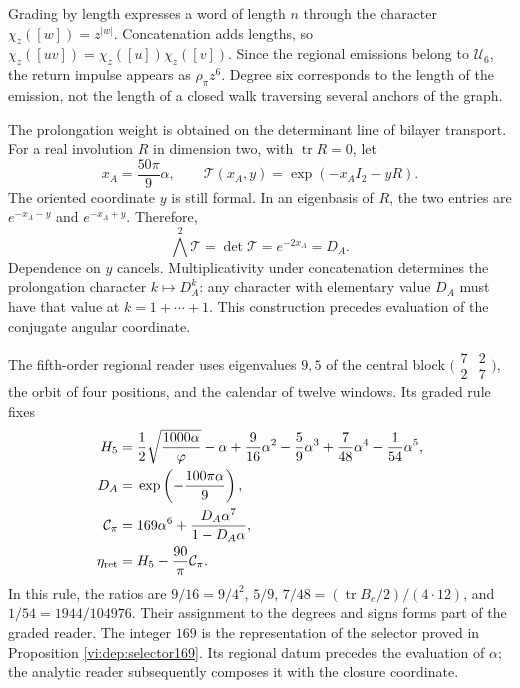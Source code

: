 Grading by length expresses a word of length \(n\)
through the character \(\chi_z([w])=z^{|w|}\). Concatenation
adds lengths, so
\(\chi_z([uv])=\chi_z([u])\chi_z([v])\). Since the regional
emissions belong to \(\mathcal U_6\), the return impulse
appears as \(\rho_\pi z^6\). Degree six corresponds to the
length of the emission, not the length of a closed walk
traversing several anchors of the graph.

The prolongation weight is obtained on the determinant line of
bilayer transport. For a real involution \(R\) in dimension two,
with \(\operatorname{tr}R=0\), let
\[
 x_A=\frac{50\pi}{9}\alpha,\qquad
 \mathcal T(x_A,y)=\exp(-x_AI_2-yR).
\]
The oriented coordinate \(y\) is still formal. In an eigenbasis
of \(R\), the two entries are \(e^{-x_A-y}\) and
\(e^{-x_A+y}\). Therefore,
\[
 \bigwedge^2\mathcal T=\det\mathcal T
 =e^{-2x_A}=D_A.
\]
Dependence on \(y\) cancels. Multiplicativity under
concatenation determines the prolongation character \(k\mapsto D_A^k\):
any character with elementary value \(D_A\) must have that value
at \(k=1+\cdots+1\). This construction precedes evaluation
of the conjugate angular coordinate.

The fifth-order regional reader uses eigenvalues \(9,5\)
of the central block \(\bigl(\begin{smallmatrix}7&2\\2&7\end{smallmatrix}\bigr)\),
the orbit of four positions, and the calendar of twelve windows.
Its graded rule fixes
\begin{align}
 H_5={}&\frac12\sqrt{\frac{1000\alpha}{\varphi}}-\alpha
       +\frac9{16}\alpha^2-\frac59\alpha^3
       +\frac7{48}\alpha^4-\frac1{54}\alpha^5,\notag\\
 D_A={}&\exp\left(-\frac{100\pi\alpha}{9}\right),\notag\\
 \mathcal C_\pi={}&169\alpha^6+
                  \frac{D_A\alpha^7}{1-D_A\alpha},\notag\\
 \eta_{\rm ret}={}&H_5-\frac{90}{\pi}\mathcal C_\pi.
 \label{vi:dep:mantisas}
\end{align}
In this rule, the ratios are
\(9/16=9/4^2\), \(5/9\), \(7/48=(\operatorname{tr}B_c/2)/(4\cdot12)\),
and \(1/54=1944/104976\). Their assignment to the degrees and signs
forms part of the graded reader. The integer \(169\) is the representation
of the selector proved in Proposition \ref{vi:dep:selector169}.
Its regional datum precedes the evaluation of \(\alpha\); the
analytic reader subsequently composes it with the closure coordinate.

